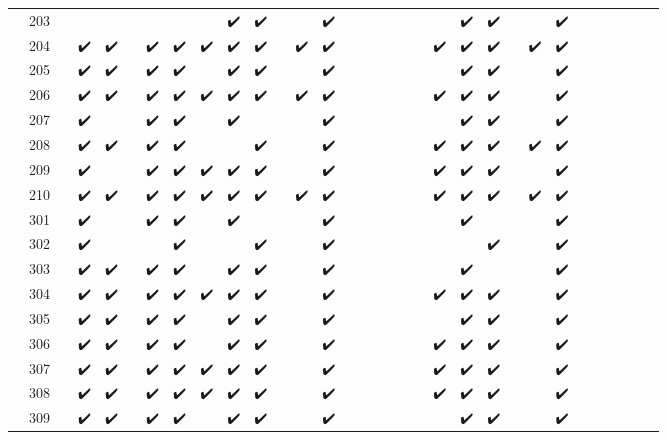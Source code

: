 \begin{tabular}{llcccccccccccccccccccccccccccccc}
 & 203 &  &  &  &  &  &  &  & ✔️ & ✔️ &  &  & ✔️ &  &  &  &  &  &  &  & ✔️ & ✔️ &  &  & ✔️ &  &  &  &  &  &  \\
 & 204 &  & ✔️ & ✔️ &  & ✔️ & ✔️ & ✔️ & ✔️ & ✔️ &  & ✔️ & ✔️ &  &  &  &  &  &  & ✔️ & ✔️ & ✔️ &  & ✔️ & ✔️ &  &  &  &  &  &  \\
 & 205 &  & ✔️ & ✔️ &  & ✔️ & ✔️ &  & ✔️ & ✔️ &  &  & ✔️ &  &  &  &  &  &  &  & ✔️ & ✔️ &  &  & ✔️ &  &  &  &  &  &  \\
 & 206 &  & ✔️ & ✔️ &  & ✔️ & ✔️ & ✔️ & ✔️ & ✔️ &  & ✔️ & ✔️ &  &  &  &  &  &  & ✔️ & ✔️ & ✔️ &  &  & ✔️ &  &  &  &  &  &  \\
 & 207 &  & ✔️ &  &  & ✔️ & ✔️ &  & ✔️ &  &  &  & ✔️ &  &  &  &  &  &  &  & ✔️ & ✔️ &  &  & ✔️ &  &  &  &  &  &  \\
 & 208 &  & ✔️ & ✔️ &  & ✔️ & ✔️ &  &  & ✔️ &  &  & ✔️ &  &  &  &  &  &  & ✔️ & ✔️ & ✔️ &  & ✔️ & ✔️ &  &  &  &  &  &  \\
 & 209 &  & ✔️ &  &  & ✔️ & ✔️ & ✔️ & ✔️ & ✔️ &  &  & ✔️ &  &  &  &  &  &  & ✔️ & ✔️ & ✔️ &  &  & ✔️ &  &  &  &  &  &  \\
 & 210 &  & ✔️ & ✔️ &  & ✔️ & ✔️ & ✔️ & ✔️ & ✔️ &  & ✔️ & ✔️ &  &  &  &  &  &  & ✔️ & ✔️ & ✔️ &  & ✔️ & ✔️ &  &  &  &  &  &  \\
 & 301 &  & ✔️ &  &  & ✔️ & ✔️ &  & ✔️ &  &  &  & ✔️ &  &  &  &  &  &  &  & ✔️ &  &  &  & ✔️ &  &  &  &  &  &  \\
 & 302 &  & ✔️ &  &  &  & ✔️ &  &  & ✔️ &  &  & ✔️ &  &  &  &  &  &  &  &  & ✔️ &  &  & ✔️ &  &  &  &  &  &  \\
 & 303 &  & ✔️ & ✔️ &  & ✔️ & ✔️ &  & ✔️ & ✔️ &  &  & ✔️ &  &  &  &  &  &  &  & ✔️ &  &  &  & ✔️ &  &  &  &  &  &  \\
 & 304 &  & ✔️ & ✔️ &  & ✔️ & ✔️ & ✔️ & ✔️ & ✔️ &  &  & ✔️ &  &  &  &  &  &  & ✔️ & ✔️ & ✔️ &  &  & ✔️ &  &  &  &  &  &  \\
 & 305 &  & ✔️ & ✔️ &  & ✔️ & ✔️ &  & ✔️ & ✔️ &  &  & ✔️ &  &  &  &  &  &  &  & ✔️ & ✔️ &  &  & ✔️ &  &  &  &  &  &  \\
 & 306 &  & ✔️ & ✔️ &  & ✔️ & ✔️ &  & ✔️ & ✔️ &  &  & ✔️ &  &  &  &  &  &  & ✔️ & ✔️ & ✔️ &  &  & ✔️ &  &  &  &  &  &  \\
 & 307 &  & ✔️ & ✔️ &  & ✔️ & ✔️ & ✔️ & ✔️ & ✔️ &  &  & ✔️ &  &  &  &  &  &  & ✔️ & ✔️ & ✔️ &  &  & ✔️ &  &  &  &  &  &  \\
 & 308 &  & ✔️ & ✔️ &  & ✔️ & ✔️ & ✔️ & ✔️ & ✔️ &  &  & ✔️ &  &  &  &  &  &  & ✔️ & ✔️ & ✔️ &  &  & ✔️ &  &  &  &  &  &  \\
 & 309 &  & ✔️ & ✔️ &  & ✔️ & ✔️ &  & ✔️ & ✔️ &  &  & ✔️ &  &  &  &  &  &  &  & ✔️ & ✔️ &  &  & ✔️ &  &  &  &  &  &  \\

\end{tabular}
